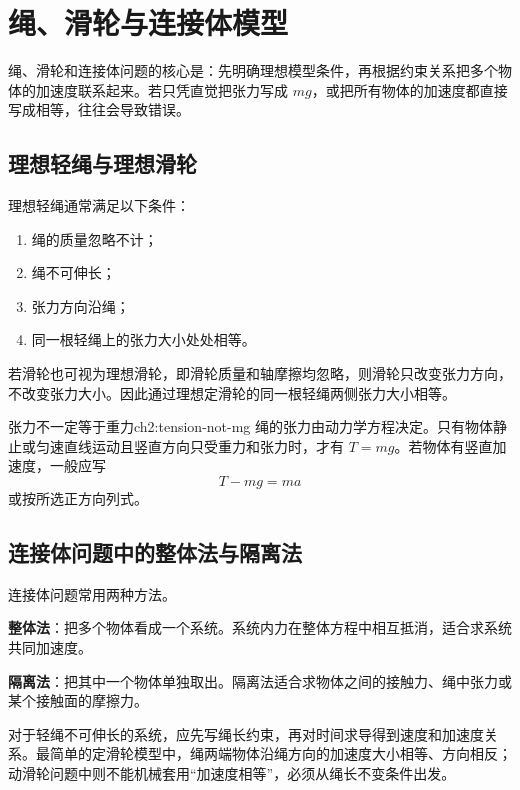 
\section{绳、滑轮与连接体模型}

绳、滑轮和连接体问题的核心是：先明确理想模型条件，再根据约束关系把多个物体的加速度联系起来。若只凭直觉把张力写成 $mg$，或把所有物体的加速度都直接写成相等，往往会导致错误。

\subsection{理想轻绳与理想滑轮}

理想轻绳通常满足以下条件：
\begin{enumerate}
    \item 绳的质量忽略不计；
    \item 绳不可伸长；
    \item 张力方向沿绳；
    \item 同一根轻绳上的张力大小处处相等。
\end{enumerate}

若滑轮也可视为理想滑轮，即滑轮质量和轴摩擦均忽略，则滑轮只改变张力方向，不改变张力大小。因此通过理想定滑轮的同一根轻绳两侧张力大小相等。

\begin{attention}{张力不一定等于重力}{ch2:tension-not-mg}
绳的张力由动力学方程决定。只有物体静止或匀速直线运动且竖直方向只受重力和张力时，才有 $T=mg$。若物体有竖直加速度，一般应写
\[
    T-mg=ma
\]
或按所选正方向列式。
\end{attention}

\subsection{连接体问题中的整体法与隔离法}

连接体问题常用两种方法。

\textbf{整体法}：把多个物体看成一个系统。系统内力在整体方程中相互抵消，适合求系统共同加速度。

\textbf{隔离法}：把其中一个物体单独取出。隔离法适合求物体之间的接触力、绳中张力或某个接触面的摩擦力。

对于轻绳不可伸长的系统，应先写绳长约束，再对时间求导得到速度和加速度关系。最简单的定滑轮模型中，绳两端物体沿绳方向的加速度大小相等、方向相反；动滑轮问题中则不能机械套用“加速度相等”，必须从绳长不变条件出发。

